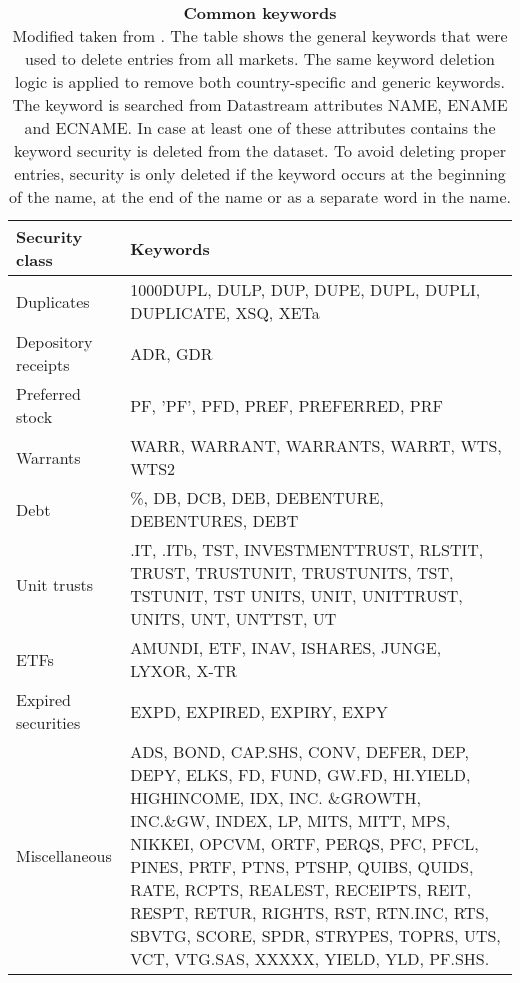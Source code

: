 \documentclass[12pt]{article}
\begin{document}
\begin{appendices}
\begin{table}[H] 
\footnotesize
\caption[Common keywords]{\textbf{Common keywords}\\ Modified taken from \protect\citet{HANAUER2023106712}. The table shows the general keywords that were used to delete entries from all markets. The same keyword deletion logic is applied to remove both country-specific and generic keywords. The keyword is searched from Datastream attributes NAME, ENAME and ECNAME. In case at least one of these attributes contains the keyword security is deleted from the dataset. To avoid deleting proper entries, security is only deleted if the keyword occurs at the beginning of the name, at the end of the name or as a separate word in the name.\footnotemark}
 \label{table:GeneralKeywords}
\centering
\begin{tabularx}{\textwidth}{l X}
\toprule
Security class 	& Keywords \\
\midrule
Duplicates 		& 1000DUPL, DULP, DUP, DUPE, DUPL, DUPLI, DUPLICATE, XSQ, XETa  \\[1ex]
Depository receipts	& ADR, GDR \\[1ex]
Preferred stock 	&  PF, ’PF’, PFD, PREF, PREFERRED, PRF\\ [1ex]
Warrants 			&  WARR, WARRANT, WARRANTS, WARRT, WTS, WTS2\\[1ex]
Debt 			& \%, DB, DCB, DEB, DEBENTURE, DEBENTURES, DEBT\\[1ex]
Unit trusts 		& .IT, .ITb, TST, INVESTMENTTRUST, RLSTIT, TRUST, TRUSTUNIT, TRUSTUNITS, TST, TSTUNIT, TST UNITS, UNIT, UNITTRUST, UNITS, UNT, UNTTST, UT\\[1ex]
ETFs 			& AMUNDI, ETF, INAV, ISHARES, JUNGE, LYXOR, X-TR\\[1ex]
Expired securities 	& EXPD, EXPIRED, EXPIRY, EXPY\\[1ex]
Miscellaneous 		& ADS, BOND, CAP.SHS, CONV, DEFER, DEP, DEPY, ELKS, FD, FUND, GW.FD, HI.YIELD, HIGHINCOME, IDX, INC.								\&GROWTH, INC.\&GW, INDEX, LP, MITS, MITT, MPS, NIKKEI, OPCVM, ORTF, PERQS, 												PFC, PFCL, PINES, PRTF, PTNS, PTSHP, QUIBS, QUIDS, RATE, RCPTS, REALEST, RECEIPTS, REIT, RESPT, 								RETUR, RIGHTS, RST, RTN.INC, RTS, SBVTG, SCORE, SPDR, STRYPES, TOPRS, UTS, VCT, VTG.SAS, 									XXXXX, YIELD, YLD, PF.SHS.\\
\bottomrule
\end{tabularx}
\end{table} 


\end{appendices}
\end{document}
